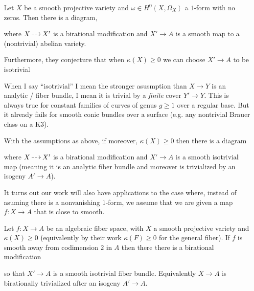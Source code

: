 \documentclass[12pt]{article}
\begin{document}
\begin{conj}
Let $X$ be a smooth projective variety and $\omega \in H^0(X, \Omega_X)$ a $1$-form with no zeros. Then there is a diagram,
\begin{center}
\end{center}
where $X \rat X'$ is a birational modification and $X' \to A$ is a smooth map to a (nontrivial) abelian variety.
\end{conj}

Furthermore, they conjecture that when $\kappa(X) \ge 0$ we can choose $X' \to A$ to be isotrivial 

\begin{rmk}
When I say ``isotrivial'' I mean the stronger asusmption than $X \to Y$ is an analytic / \etale fiber bundle, I mean it is trivial by a \textit{finite} \etale cover $Y' \to Y$. This is always true for constant families of curves of genus $g \ge 1$ over a regular base. But it already fails for smooth conic bundles over a surface (e.g. any nontrivial Brauer class on a K3). 
\end{rmk}

\begin{conj}
With the assumptions as above, if moreover, $\kappa(X) \ge 0$ then there is a diagram
\begin{center}
\end{center}
where $X \rat X'$ is a birational modification and $X' \to A$ is a smooth isotrivial map (meaning it is an analytic fiber bundle and moreover is trivialized by an isogeny $A' \to A$).
\end{conj}

It turns out our work will also have applications to the case where, instead of asuming there is a nonvanishing $1$-form, we assume that we are given a map $f : X \to A$ that is close to smooth.

\begin{conj}
Let $f : X \to A$ be an algebraic fiber space, with $X$ a smooth projective variety and $\kappa(X) \ge 0$ (equivalently by their work $\kappa(F) \ge 0$ for the general fiber). If $f$ is smooth away from codimension $2$ in $A$ then there there is a birational modification
\begin{center}
\end{center}
so that $X' \to A$ is a smooth isotrivial fiber bundle. Equivalently $X \to A$ is birationally trivialized after an isogeny $A' \to A$. 
\end{conj}
\end{document}
